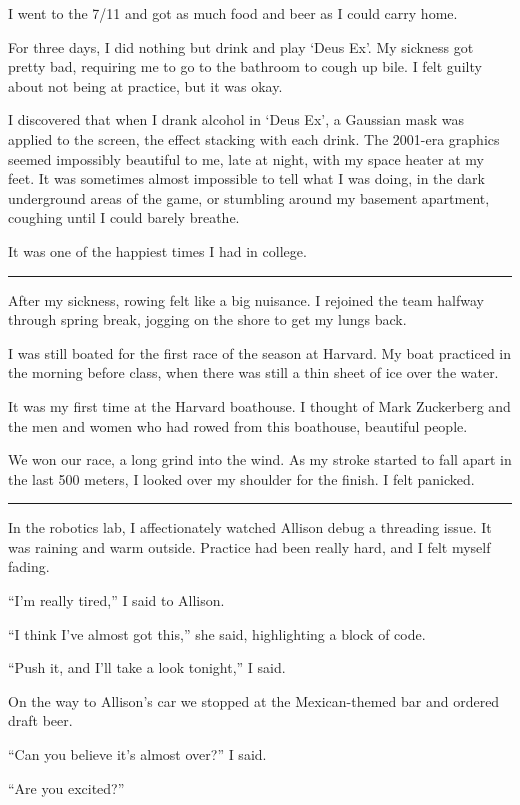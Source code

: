 I went to the 7/11 and got as much food and beer as I could carry home.

For three days, I did nothing but drink and play `Deus Ex'.  My sickness got
pretty bad, requiring me to go to the bathroom to cough up bile.  I felt guilty
about not being at practice, but it was okay.   

I discovered that when I drank alcohol in `Deus Ex', a Gaussian mask was applied
to the screen, the effect stacking with each drink.  The 2001-era graphics
seemed impossibly beautiful to me, late at night, with my space heater at my
feet.  It was sometimes almost impossible to tell what I was doing, in the dark
underground areas of the game, or stumbling around my basement apartment,
coughing until I could barely breathe.

It was one of the happiest times I had in college.

\plainfancybreak{12pt}{2}{}

After my sickness, rowing felt like a big nuisance.  I rejoined the team halfway
through spring break, jogging on the shore to get my lungs back.  

I was still boated for the first race of the season at Harvard.  My boat
practiced in the morning before class, when there was still a thin sheet of ice
over the water.

It was my first time at the Harvard boathouse.  I thought of Mark Zuckerberg and
the men and women who had rowed from this boathouse, beautiful people. 

We won our race, a long grind into the wind.  As my stroke started to fall apart
in the last 500 meters, I looked over my shoulder for the finish.  I felt
panicked.

\plainfancybreak{12pt}{2}{}

In the robotics lab, I affectionately watched Allison debug a threading issue.
It was raining and warm outside.  Practice had been really hard, and I felt
myself fading.

``I'm really tired,'' I said to Allison.

``I think I've almost got this,'' she said, highlighting a block of code.

``Push it, and I'll take a look tonight,'' I said.

On the way to Allison's car we stopped at the Mexican-themed bar and ordered
draft beer.

``Can you believe it's almost over?'' I said.

``Are you excited?''


